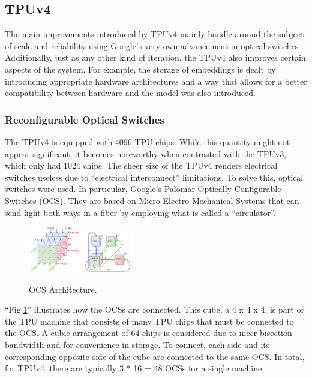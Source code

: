 \subsection{TPUv4}
\label{subsec:tpuv4}
The main improvements introduced by TPUv4 mainly handle around the subject of scale and reliability using Google's very own advancement in optical switches \cite{b7}.
Additionally, just as any other kind of iteration, the TPUv4 also improves certain aspects of the system.
For example, the storage of embeddings is dealt by introducing appropriate hardware architectures and a way that allows for a better compatibility between hardware and the model was also introduced.

\subsubsection{Reconfigurable Optical Switches}
The TPUv4 is equipped with 4096 TPU chips.
While this quantity might not appear significant, it becomes noteworthy when contrasted with the TPUv3, which only had 1024 chips.
The sheer size of the TPUv4 renders electrical switches useless due to ``electrical interconnect'' limitations.
To solve this, optical switches were used.
In particular, Google's Palomar Optically Configurable Switches (OCS).
They are based on Micro-Electro-Mechanical Systems that can send light both ways in a fiber by employing what is called a ``circulator''.

\begin{figure}[htbp!]
    \centerline{\includegraphics[width=0.2\textwidth]{images/tpu_cube}
    \includegraphics[width=0.2\textwidth]{images/tpu_connectivity}}
    \caption{OCS Architecture.}
    \label{fig:ocsarch}
\end{figure}

``Fig.\ref{fig:ocsarch}'' illustrates how the OCSs are connected.
This cube, a 4 x 4 x 4, is part of the TPU machine that consists of many TPU chips that must be connected to the OCS\@.
A cubic arrangement of 64 chips is considered due to nicer bisection bandwidth and for convenience in storage.
To connect, each side and its corresponding opposite side of the cube are connected to the same OCS\@.
In total, for TPUv4, there are typically 3 * 16 = 48 OCSs for a single machine.

